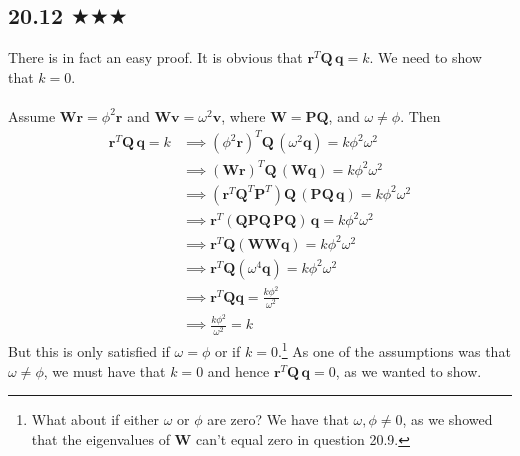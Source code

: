 \subsection{20.12 $\bigstar\bigstar\bigstar$}
There is in fact an easy proof. It is obvious that $\mathbf{r}^T\mathbf{Q}\,\mathbf{q}= k$. We need to show that $k=0$. \\ \\ Assume $\mathbf{W}\mathbf{r}=\phi^2\mathbf{r}$ and $\mathbf{W}\mathbf{v}=\omega^2\mathbf{v}$, where $\mathbf{W}=\mathbf{P}\mathbf{Q}$, and $\omega\neq \phi$. Then 
\begin{align*}
\mathbf{r}^T\mathbf{Q}\,\mathbf{q}=k&\implies  (\phi^2\mathbf{r})^T\mathbf{Q}\,(\omega^2\mathbf{q})=k\phi^2\omega^2\\
&\implies (\mathbf{W}\mathbf{r})^T\mathbf{Q}\,(\mathbf{W}\mathbf{q})=k\phi^2\omega^2\\
&\implies (\mathbf{r}^T\mathbf{Q}^T\mathbf{P}^T) \mathbf{Q}\,(\mathbf{P}\mathbf{Q}\,\mathbf{q})=k\phi^2\omega^2\\
&\implies \mathbf{r}^T(\mathbf{Q}\mathbf{P} \mathbf{Q}\,\mathbf{P}\mathbf{Q})\,\mathbf{q}=k\phi^2\omega^2\\
&\implies \mathbf{r}^T\mathbf{Q}(\mathbf{W}\mathbf{W}\mathbf{q})=k\phi^2\omega^2\\
&\implies \mathbf{r}^T\mathbf{Q}(\omega^4\mathbf{q})=k\phi^2\omega^2\\
&\implies \mathbf{r}^T\mathbf{Q}\mathbf{q}=\frac{k\phi^2}{\omega^2}\\
&\implies \frac{k\phi^2}{\omega^2}=k
\end{align*}
But this is only satisfied if $\omega=\phi$ or if $k=0$.\footnote{What about if either $\omega$ or $\phi$ are zero? We have that $\omega,\phi\neq 0$, as we showed that the  eigenvalues of $\mathbf{W}$ can't equal zero in question 20.9.}  As one of the assumptions was that $\omega\neq\phi$, we must have that $k=0$ and hence $\mathbf{r}^T\mathbf{Q}\,\mathbf{q}= 0$, as we wanted to show.
